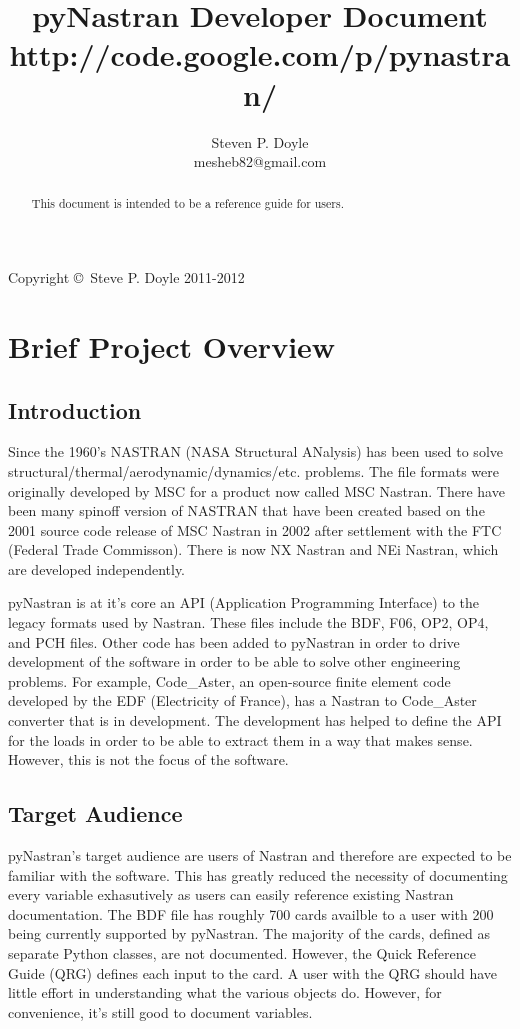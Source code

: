 
\title{pyNastran Developer Document \\
\small http://code.google.com/p/pynastran/ }
\author{Steven P. Doyle\\
{\small mesheb82@gmail.com}
}

\maketitle

\begin{abstract}
This document is intended to be a reference guide for users.
\end{abstract}

Copyright \copyright\ Steve P. Doyle 2011-2012
\newpage

\tableofcontents
\newpage

\section{Brief Project Overview}
  \subsection{Introduction}
      Since the 1960's NASTRAN (NASA Structural ANalysis) has been used to solve structural/thermal/aerodynamic/dynamics/etc. problems.  The file formats were originally developed by MSC for a product now called MSC Nastran.  There have been many spinoff version of NASTRAN that have been created based on the 2001 source code release of MSC Nastran in 2002 after settlement with the FTC (Federal Trade Commisson).  There is now NX Nastran and NEi Nastran, which are developed independently.
     
     pyNastran is at it's core an API (Application Programming Interface) to the legacy formats used by Nastran.  These files include the BDF, F06, OP2, OP4, and PCH files.  Other code has been added to pyNastran in order to drive development of the software in order to be able to solve other engineering problems.  For example, Code\_Aster, an open-source finite element code developed by the EDF (Electricity of France), has a Nastran to Code\_Aster converter that is in development.  The development has helped to define the API for the loads in order to be able to extract them in a way that makes sense.  However, this is not the focus of the software.

  \subsection{Target Audience}
      pyNastran's target audience are users of Nastran and therefore are expected to be familiar with the software.  This has greatly reduced the necessity of documenting every variable exhasutively as users can easily reference existing Nastran documentation. The BDF file has roughly 700 cards availble to a user with 200 being currently supported by pyNastran.  The majority of the cards, defined as separate Python classes, are not documented.  However, the Quick Reference Guide (QRG) defines each input to the card.  A user with the QRG should have little effort in understanding what the various objects do.  However, for convenience, it's still good to document variables.

